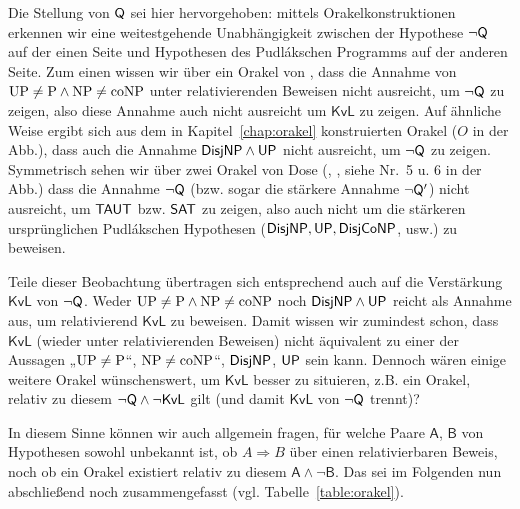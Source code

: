Die Stellung von $\mathsf{Q}$ sei hier hervorgehoben: mittels Orakelkonstruktionen erkennen wir eine weitestgehende Unabhängigkeit zwischen der Hypothese $\neg\mathsf{Q}$ auf der einen Seite und Hypothesen des Pudlákschen Programms auf der anderen Seite. Zum einen wissen wir über ein Orakel von \textcite[Thm.~12.3, Nr.~8 in der Abb.]{fenner_inverting_2003}, dass die Annahme von $\mathrm{UP}\neq\mathrm{P}\land \mathrm{NP}\neq\mathrm{coNP}$ unter relativierenden Beweisen nicht ausreicht, um $\neg\mathsf{Q}$ zu zeigen, also diese Annahme auch nicht ausreicht um $\mathsf{KvL}$ zu zeigen.
Auf ähnliche Weise ergibt sich aus dem in Kapitel~\ref{chap:orakel} konstruierten Orakel ($O$ in der Abb.), dass auch die Annahme $\mathsf{DisjNP}\land\mathsf{UP}$ nicht ausreicht, um $\neg\mathsf{Q}$ zu zeigen.
Symmetrisch sehen wir über zwei Orakel von Dose (\cite*[Cor.~3.3]{dose_oracle_2020}, \cite*[Thm.~3.2]{dose_further_2020}, siehe Nr.~5 u. 6 in der Abb.) dass die Annahme $\neg\mathsf{Q}$ (bzw. sogar die stärkere Annahme $\neg\mathsf{Q}'$) nicht ausreicht, um $\mathsf{TAUT}$ bzw. $\mathsf{SAT}$ zu zeigen, also auch nicht um die stärkeren ursprünglichen Pudlákschen Hypothesen ($\mathsf{DisjNP}, \mathsf{UP}, \mathsf{DisjCoNP}$, usw.) zu beweisen.



Teile dieser Beobachtung übertragen sich entsprechend auch auf die Verstärkung $\mathsf{KvL}$ von $\neg\mathsf{Q}$. Weder $\mathrm{UP}\neq\mathrm{P}\land \mathrm{NP}\neq\mathrm{coNP}$ noch $\mathsf{DisjNP}\land\mathsf{UP}$ reicht als Annahme aus, um relativierend $\mathsf{KvL}$ zu beweisen.
Damit wissen wir zumindest schon, dass $\mathsf{KvL}$ (wieder unter relativierenden Beweisen) nicht äquivalent zu einer der Aussagen „$\mathrm{UP}\neq \mathrm{P}$“, $\mathrm{NP}\neq\mathrm{coNP}$“, $\mathsf{DisjNP}$, $\mathsf{UP}$ sein kann. 
Dennoch wären einige weitere Orakel wünschenswert, um $\mathsf{KvL}$ besser zu situieren, z.B. ein Orakel, relativ zu diesem $\neg\mathsf{Q} \land \neg\mathsf{KvL}$  gilt (und damit $\mathsf{KvL}$ von $\neg\mathsf{Q}$ trennt)? 

In diesem Sinne können wir auch allgemein fragen, für welche Paare $\mathsf{A}$, $\mathsf{B}$ von Hypothesen sowohl unbekannt ist, ob $A\Rightarrow B$ über einen relativierbaren Beweis, noch ob ein Orakel existiert relativ zu diesem $\mathsf{A\land \neg B}$.
Das sei im Folgenden nun abschließend noch zusammengefasst (vgl. Tabelle~\ref{table:orakel}).

